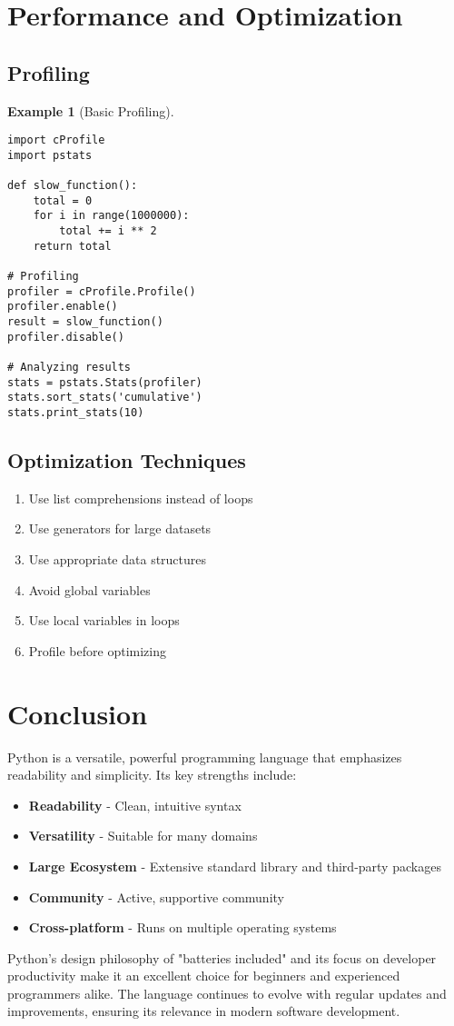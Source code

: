 \documentclass[11pt]{article}
\newtheorem{example}{Example}[section]
\begin{document}
\section{Performance and Optimization}

\subsection{Profiling}

\begin{example}[Basic Profiling]
\begin{lstlisting}
import cProfile
import pstats

def slow_function():
    total = 0
    for i in range(1000000):
        total += i ** 2
    return total

# Profiling
profiler = cProfile.Profile()
profiler.enable()
result = slow_function()
profiler.disable()

# Analyzing results
stats = pstats.Stats(profiler)
stats.sort_stats('cumulative')
stats.print_stats(10)
\end{lstlisting}
\end{example}

\subsection{Optimization Techniques}

\begin{enumerate}
    \item Use list comprehensions instead of loops
    \item Use generators for large datasets
    \item Use appropriate data structures
    \item Avoid global variables
    \item Use local variables in loops
    \item Profile before optimizing
\end{enumerate}

\section{Conclusion}

Python is a versatile, powerful programming language that emphasizes readability and simplicity. Its key strengths include:

\begin{itemize}
    \item \textbf{Readability} - Clean, intuitive syntax
    \item \textbf{Versatility} - Suitable for many domains
    \item \textbf{Large Ecosystem} - Extensive standard library and third-party packages
    \item \textbf{Community} - Active, supportive community
    \item \textbf{Cross-platform} - Runs on multiple operating systems
\end{itemize}

Python's design philosophy of "batteries included" and its focus on developer productivity make it an excellent choice for beginners and experienced programmers alike. The language continues to evolve with regular updates and improvements, ensuring its relevance in modern software development.
\end{document}

